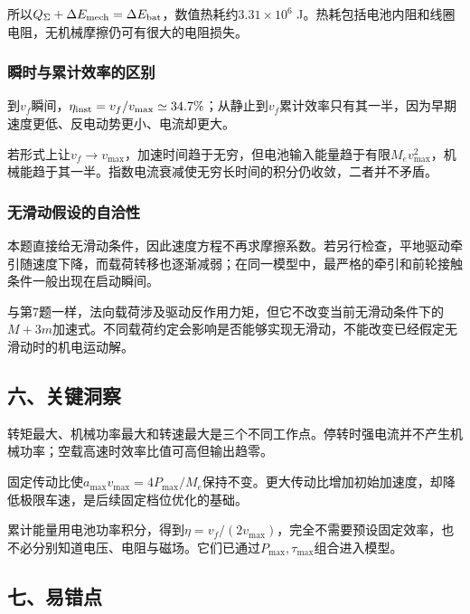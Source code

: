 \documentclass[12pt,a4paper,fontset=fandol]{ctexart}
\begin{document}
所以\(Q_\Sigma+\Delta E_{\rm mech}=\Delta E_{\rm bat}\)，数值热耗约\(3.31\times10^6\)
J。热耗包括电池内阻和线圈电阻，无机械摩擦仍可有很大的电阻损失。

\subsubsection{瞬时与累计效率的区别}\label{ux77acux65f6ux4e0eux7d2fux8ba1ux6548ux7387ux7684ux533aux522b}

到\(v_f\)瞬间，\(\eta_{\rm inst}=v_f/v_{\max}\simeq34.7\%\)；从静止到\(v_f\)累计效率只有其一半，因为早期速度更低、反电动势更小、电流却更大。

若形式上让\(v_f\to v_{\max}\)，加速时间趋于无穷，但电池输入能量趋于有限\(M_ev_{\max}^2\)，机械能趋于其一半。指数电流衰减使无穷长时间的积分仍收敛，二者并不矛盾。

\subsubsection{无滑动假设的自洽性}\label{ux65e0ux6ed1ux52a8ux5047ux8bbeux7684ux81eaux6d3dux6027}

本题直接给无滑动条件，因此速度方程不再求摩擦系数。若另行检查，平地驱动牵引随速度下降，而载荷转移也逐渐减弱；在同一模型中，最严格的牵引和前轮接触条件一般出现在启动瞬间。

与第7题一样，法向载荷涉及驱动反作用力矩，但它不改变当前无滑动条件下的\(M+3m\)加速式。不同载荷约定会影响是否能够实现无滑动，不能改变已经假定无滑动时的机电运动解。

\subsection{六、关键洞察}\label{ux516dux5173ux952eux6d1eux5bdf-7}

转矩最大、机械功率最大和转速最大是三个不同工作点。停转时强电流并不产生机械功率；空载高速时效率比值可高但输出趋零。

固定传动比使\(a_{\max}v_{\max}=4P_{\max}/M_e\)保持不变。更大传动比增加初始加速度，却降低极限车速，是后续固定档位优化的基础。

累计能量用电池功率积分，得到\(\eta=v_f/(2v_{\max})\)，完全不需要预设固定效率，也不必分别知道电压、电阻与磁场。它们已通过\(P_{\max},\tau_{\max}\)组合进入模型。

\subsection{七、易错点}\label{ux4e03ux6613ux9519ux70b9-7}
\end{document}

